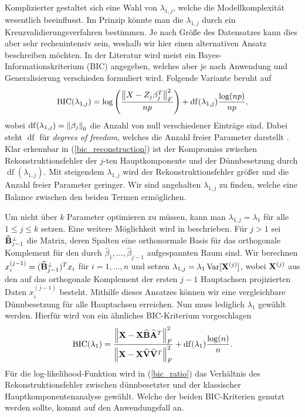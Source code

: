 Komplizierter gestaltet sich eine Wahl von $\lambda_{1,j}$, welche die Modellkomplexität wesentlich beeinflusst. Im Prinzip könnte man die $\lambda_{1,j}$ durch ein Kreuzvalidierungsverfahren bestimmen. Je nach Größe des Datensatzes kann dies aber sehr rechenintensiv sein, weshalb wir hier einen alternativen Ansatz beschreiben möchten. In der Literatur wird meist ein Bayes-Informationskriterium (BIC) angegeben, welches aber je nach Anwendung und Generalisierung verschieden formuliert wird. Folgende Variante beruht auf \cite{hubert, allen}
\begin{align}
\label{bic_reconstruction}
\operatorname{BIC}(\lambda_{1,j}) = \log\left(\frac{\left\lVert X - Z_j\beta_j^T \right\rVert_{F}^{2}}{np}\right) + \operatorname{df}(\lambda_{1,j}) \frac{\log(np)}{np},
\end{align}
wobei $\operatorname{df}(\lambda_{1,j}) = \left\lVert \beta_j \right\rVert_0$ die Anzahl von null verschiedener Einträge sind. Dabei steht $\operatorname{df}$ für \textit{degrees of freedom}, welches die Anzahl freier Parameter darstellt \cite{hastie_elements}. Klar erkennbar in (\ref{bic_reconstruction}) ist der Kompromiss zwischen Rekonstruktionsfehler der $j$-ten Hauptkomponente und der Dünnbesetzung durch $\operatorname{df}(\lambda_{1,j})$. Mit steigendem $\lambda_{1,j}$ wird der Rekonstruktionsfehler größer und die Anzahl freier Parameter geringer. Wir sind angehalten $\lambda_{1,j}$ zu finden, welche eine Balance zwischen den beiden Termen ermöglichen.

Um nicht über $k$ Parameter optimieren zu müssen, kann man $\lambda_{1,j} = \lambda_1$ für alle $1 \leq j \leq k$ setzen. Eine weitere Möglichkeit wird in \cite{croux} beschrieben. Für $j>1$ sei $\mathbf{\widehat{B}}_{j-1}^{\perp}$ die Matrix, deren Spalten eine orthonormale Basis für das orthogonale Komplement für den durch $\widehat{\beta}_1, \ldots, \widehat{\beta}_{j-1}$ aufgespannten Raum sind. Wir berechnen $x_i^{(j-1)} = (\mathbf{\widehat{B}}_{j-1}^{\perp})^T x_i$ für $i = 1, \ldots, n$ und setzen $\lambda_{1,j} = \lambda_1\operatorname{Var}[\mathbf{X}^{(j)}]$, wobei $\mathbf{X}^{(j)}$ aus den auf das orthogonale Komplement der ersten $j-1$ Hauptachsen projizierten Daten $x_i^{(j-1)}$ besteht. Mithilfe dieses Ansatzes können wir eine vergleichbare Dünnbesetzung für alle Hauptachsen erreichen. Nun muss lediglich $\lambda_1$ gewählt werden. Hierfür wird von \cite{croux, guo} ein ähnliches BIC-Kriterium vorgeschlagen
\begin{align}
\label{bic_ratio}
\operatorname{BIC}(\lambda_1) = \frac{\left\lVert \mathbf{X} - \mathbf{X} \widehat{\mathbf{B}} \widehat{\mathbf{A}}^T \right\rVert_{F}^{2}}{\left\lVert \mathbf{X} - \mathbf{X} \widehat{\mathbf{V}} \widehat{\mathbf{V}}^T \right\rVert_{F}^{2}} + \operatorname{df}(\lambda_1) \frac{\log(n)}{n}.
\end{align}
Für die log-likelihood-Funktion wird in (\ref{bic_ratio}) das Verhältnis des Rekonstruktionsfehler zwischen dünnbesetzter und der klassischer Hauptkomponentenanalyse gewählt. Welche der beiden BIC-Kriterien genutzt werden sollte, kommt auf den Anwendungsfall an.

